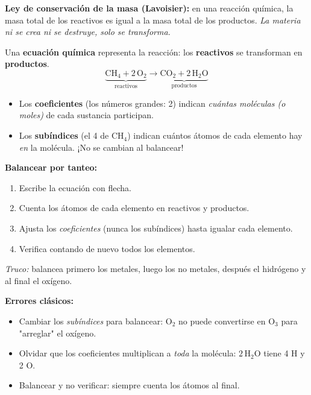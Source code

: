 \documentclass[12pt, letterpaper]{article}
\begin{document}
\begin{cuadroteoria}
  \textbf{Ley de conservación de la masa (Lavoisier):} en una reacción química, la masa total de los reactivos es igual a la masa total de los productos. \emph{La materia ni se crea ni se destruye, solo se transforma.}
\end{cuadroteoria}

\begin{cuadroteoria}
  Una \textbf{ecuación química} representa la reacción: los \textbf{reactivos} se transforman en \textbf{productos}.
  $$\underbrace{\text{CH}_4 + 2\,\text{O}_2}_{\text{reactivos}} \longrightarrow \underbrace{\text{CO}_2 + 2\,\text{H}_2\text{O}}_{\text{productos}}$$
  \begin{itemize}[leftmargin=*]
    \item Los \textbf{coeficientes} (los números grandes: 2) indican \emph{cuántas moléculas (o moles)} de cada sustancia participan.
    \item Los \textbf{subíndices} (el 4 de $\text{CH}_4$) indican cuántos átomos de cada elemento hay \emph{en} la molécula. ¡No se cambian al balancear!
  \end{itemize}
\end{cuadroteoria}

\begin{cuadropasos}
  \textbf{Balancear por tanteo:}
  \begin{enumerate}[leftmargin=*]
    \item Escribe la ecuación con flecha.
    \item Cuenta los átomos de cada elemento en reactivos y productos.
    \item Ajusta los \emph{coeficientes} (nunca los subíndices) hasta igualar cada elemento.
    \item Verifica contando de nuevo todos los elementos.
  \end{enumerate}
  \emph{Truco:} balancea primero los metales, luego los no metales, después el hidrógeno y al final el oxígeno.
\end{cuadropasos}

\begin{cuadroadvertencia}
  \textbf{Errores clásicos:}
  \begin{itemize}[leftmargin=*]
    \item Cambiar los \emph{subíndices} para balancear: $\text{O}_2$ no puede convertirse en $\text{O}_3$ para "arreglar" el oxígeno.
    \item Olvidar que los coeficientes multiplican a \emph{toda} la molécula: $2\,\text{H}_2\text{O}$ tiene 4 H y 2 O.
    \item Balancear y no verificar: siempre cuenta los átomos al final.
  \end{itemize}
\end{cuadroadvertencia}
\end{document}
